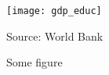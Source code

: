 \begin{figure}
\caption{Some figure\label{fig:gdp_educ}}

\begin{centering}
\medskip{}
\par\end{centering}
\begin{centering}
\texttt{[image: gdp\_educ]}\medskip{}
\par\end{centering}
{\footnotesize{}Source: World Bank}{\footnotesize\par}
\end{figure}

